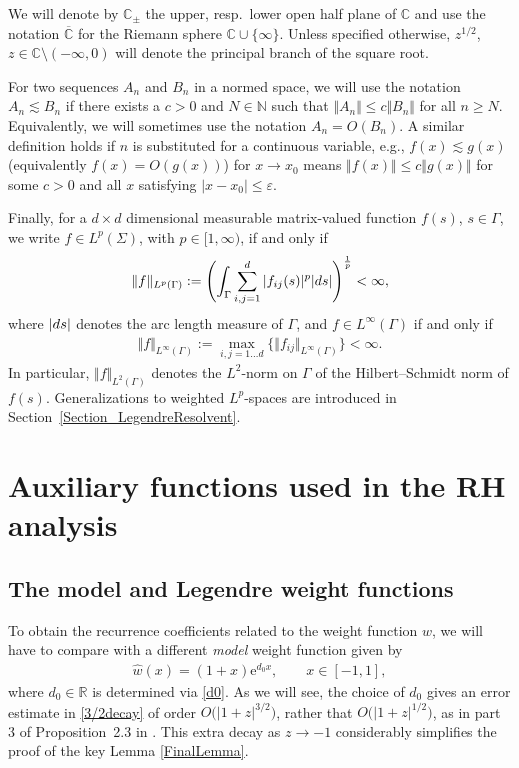 \documentclass[11pt]{article}
\numberwithin{equation}{section}
\newcommand{\R}{\mathbb{R}}
\newcommand{\C}{\mathbb{C}}
\newcommand{\hw}{\widehat w}
\newcommand{\E}{\mathrm{e}}
\numberwithin{equation}{section}
\begin{document}
We will denote by $\C_\pm$ the upper, resp.~lower open half plane of $\C$ and use the notation $\overline{\C}$ for the Riemann sphere $\C \cup \lbrace \infty \rbrace$. Unless specified otherwise, $z^{1/2}$, $z \in \C \setminus (-\infty, 0)$ will denote the principal branch of the square root.

For two sequences $A_n$ and $B_n$ in a normed space, we will use the notation $A_n \lesssim B_n$ if there exists a $c > 0$ and $N \in \mathbb{N}$ such that $\Vert A_n \Vert\leq c\Vert B_n \Vert$ for all $n \geq N$. Equivalently, we will sometimes use the notation $A_n = O(B_n)$. A similar definition holds if $n$ is substituted for a continuous variable, e.g., $f(x) \lesssim g(x)$ (equivalently $f(x) = O(g(x))$) for $x \to x_0$ means $\Vert f(x) \Vert \leq c \Vert g(x) \Vert$ for some $c > 0$ and all $x$ satisfying $|x-x_0| \leq \varepsilon$.

Finally, for a $d\times d$ dimensional measurable matrix-valued function $f(s)$, $s \in \Gamma$, we write $f \in L^p(\Sigma)$, with $p \in [1,\infty)$, if and only if \begin{align*}
 \Vert f \Vert_{L^p(\Gamma)} := \Biggl(\int_\Gamma \sum_{i,j=1}^d |f_{ij}(s)|^p |{\rm d}s|\Biggr)^{\frac{1}{p}} < \infty,
\end{align*}
where $|{\rm d}s|$ denotes the arc length measure of $\Gamma$, and $f \in L^\infty(\Gamma)$ if and only if
\begin{align*}
 \Vert f \Vert_{L^\infty(\Gamma)} := \max_{i,j = 1 \dots d}\lbrace \Vert f_{ij} \Vert_{L^\infty(\Gamma)}\rbrace < \infty.
\end{align*}
In particular, $\Vert f \Vert_{L^2(\Gamma)}$ denotes the $L^2$-norm on $\Gamma$ of the Hilbert--Schmidt norm of $f(s)$.
Generalizations to weighted $L^p$-spaces are introduced in Section~\ref{Section_LegendreResolvent}.


\section{Auxiliary functions used in the RH analysis}
\label{AuxiliaryFunctions}
\subsection{The model and Legendre weight functions}
To obtain the recurrence coefficients related to the weight function $w$, we will have to compare with a different \emph{model} weight function given by
\begin{align*}%
 \hw(x) = (1+x)\E^{d_0x}, \qquad x \in [-1,1],
\end{align*}
where $d_0 \in \R$ is determined via \eqref{d0}. As we will see, the choice of $d_0$ gives an error estimate in \eqref{3/2decay} of order $O\big(|1+z|^{3/2}\big)$, rather that $O\big(|1+z|^{1/2}\big)$, as in part 3 of Proposition~2.3 in \cite{CD}. This extra decay as $z \to -1$ considerably simplifies the proof of the key Lemma \ref{FinalLemma}.
\end{document}
